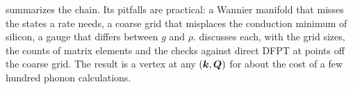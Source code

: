  summarizes the chain. Its pitfalls are practical: a Wannier manifold that misses the states a rate needs, a coarse grid that misplaces the conduction minimum of silicon, a gauge that differs between $g$ and $\rho$.  discusses each, with the grid sizes, the counts of matrix elements and the checks against direct DFPT at points off the coarse grid. The result is a vertex at any $(\bm{k},\bm{Q})$ for about the cost of a few hundred phonon calculations.
